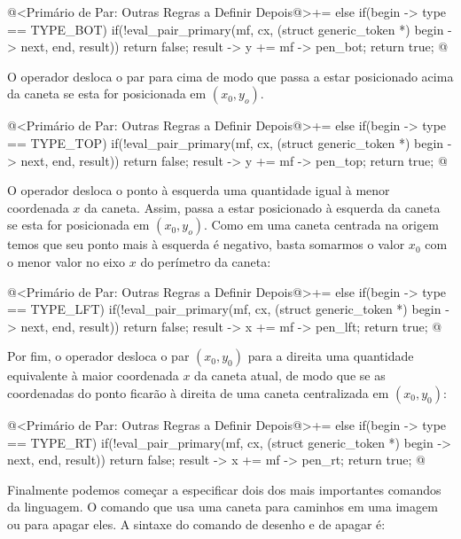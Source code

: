 {{{{{{\iniciocodigo
@<Primário de Par: Outras Regras a Definir Depois@>+=
else if(begin -> type == TYPE_BOT){
  if(!eval_pair_primary(mf, cx, (struct generic_token *)
                                begin -> next,
                        end, result))
    return false;
  result -> y += mf -> pen_bot;
  return true;
}
@
\fimcodigo

O operador  desloca o par para cima de modo
que  passa a estar posicionado acima da
caneta se esta for posicionada em $(x_0, y_o)$.

\iniciocodigo
@<Primário de Par: Outras Regras a Definir Depois@>+=
else if(begin -> type == TYPE_TOP){
  if(!eval_pair_primary(mf, cx, (struct generic_token *)
                                begin -> next,
                        end, result))
    return false;
  result -> y += mf -> pen_top;
  return true;
}
@
\fimcodigo

O operador  desloca o ponto à esquerda uma quantidade
igual à menor coordenada $x$ da caneta. Assim,  passa a estar posicionado à esquerda da caneta se esta for
posicionada em $(x_0, y_o)$. Como em uma caneta centrada na origem
temos que seu ponto mais à esquerda é negativo, basta somarmos o valor
$x_0$ com o menor valor no eixo $x$ do perímetro da caneta:

\iniciocodigo
@<Primário de Par: Outras Regras a Definir Depois@>+=
else if(begin -> type == TYPE_LFT){
  if(!eval_pair_primary(mf, cx, (struct generic_token *)
                                begin -> next,
                        end, result))
    return false;
  result -> x += mf -> pen_lft;
  return true;
}
@
\fimcodigo

Por fim, o operador  desloca o par $(x_0, y_0)$ para a
direita uma quantidade equivalente à maior coordenada $x$ da caneta
atual, de modo que se as coordenadas do ponto ficarão à direita de uma
caneta centralizada em $(x_0, y_0)$:

\iniciocodigo
@<Primário de Par: Outras Regras a Definir Depois@>+=
else if(begin  -> type == TYPE_RT){
  if(!eval_pair_primary(mf, cx, (struct generic_token *)
                                begin -> next,
                        end, result))
    return false;
  result -> x += mf -> pen_rt;
  return true;
}
@
\fimcodigo


Finalmente podemos começar a especificar dois dos mais importantes
comandos da linguagem. O comando que usa uma caneta para caminhos em
uma imagem ou para apagar eles. A sintaxe do comando de desenho e de
apagar é:

}}}}}}
